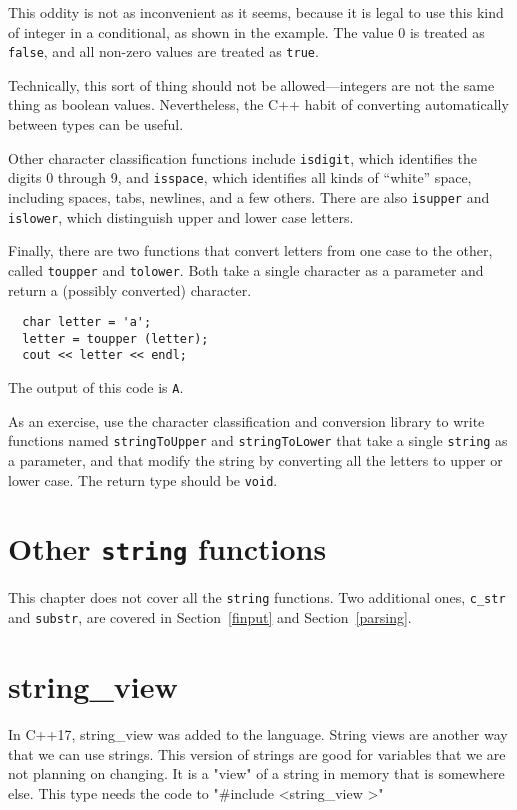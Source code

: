 This oddity is not as inconvenient as it seems, because it is
legal to use this kind of integer in a conditional, as shown
in the example.  The value 0 is treated as {\tt false}, and
all non-zero values are treated as {\tt true}.

Technically, this sort of thing should not be allowed---integers are
not the same thing as boolean values.  Nevertheless, the C++ habit of
converting automatically between types can be useful.

Other character classification functions include {\tt isdigit}, which
identifies the digits 0 through 9, and {\tt isspace}, which identifies
all kinds of ``white'' space, including spaces, tabs, newlines, and a
few others.  There are also {\tt isupper} and {\tt islower}, which
distinguish upper and lower case letters.

Finally, there are two functions that convert letters from one
case to the other, called {\tt toupper} and {\tt tolower}.  Both take
a single character as a parameter and return a (possibly
converted) character.

\begin{verbatim}
  char letter = 'a';
  letter = toupper (letter);
  cout << letter << endl;
\end{verbatim}
%
The output of this code is {\tt A}.

As an exercise, use the character classification and conversion
library to write functions named {\tt stringToUpper} and
{\tt stringToLower} that take a single {\tt string} as
a parameter, and that modify the string by converting all the
letters to upper or lower case.  The return type should be
{\tt void}.

\section{Other {\tt string} functions}

This chapter does not cover all the {\tt string} functions.
Two additional ones, {\tt c\_str} and {\tt substr}, are covered
in Section~\ref{finput} and Section~\ref{parsing}.

\section{string\_view}
In C++17, string\_view was added to the language. String
views are another way that we can use strings. This version
of strings are good for variables that we are not planning on
changing. It is a "view" of a string in memory that is
somewhere else. This type needs the code to "\#include \textless  string\_view \textgreater"

